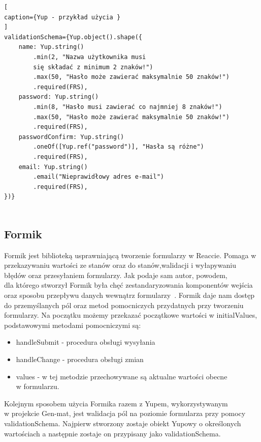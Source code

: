 \documentclass[oneside,polski,logo,indent]{amuthesis}
\begin{document}
\begin{lstlisting}[
caption={Yup - przykład użycia }
]
validationSchema={Yup.object().shape({
	name: Yup.string()
		.min(2, "Nazwa użytkownika musi 
		się składać z minimum 2 znaków!")
		.max(50, "Hasło może zawierać maksymalnie 50 znaków!")
		.required(FRS),
	password: Yup.string()
		.min(8, "Hasło musi zawierać co najmniej 8 znaków!")
		.max(50, "Hasło może zawierać maksymalnie 50 znaków!")
		.required(FRS),
	passwordConfirm: Yup.string()
		.oneOf([Yup.ref("password")], "Hasła są różne")
		.required(FRS),
	email: Yup.string()
		.email("Nieprawidłowy adres e-mail")
		.required(FRS),
})}


\end{lstlisting}


\subsection{Formik}
Formik jest biblioteką usprawniającą tworzenie formularzy w Reaccie. Pomaga w przekazywaniu wartości ze stanów oraz do stanów,walidacji i wyłapywaniu błędów oraz przesyłaniem formularzy.
Jak podaje sam autor, powodem, \\dla którego stworzył Formik była chęć zestandaryzowania komponentów wejścia oraz sposobu przepływu danych wewnątrz formularzy~\cite{formik}.
\newline
Formik daje nam dostęp do przemyślanych pól oraz metod pomocniczych przydatnych przy tworzeniu formularzy. Na początku możemy przekazać
początkowe wartości w initialValues, podstawowymi metodami pomocniczymi są:
\begin{itemize}
\item handleSubmit - procedura obsługi wysyłania
\item handleChange - procedura obsługi zmian
\item values - w tej metodzie przechowywane są aktualne wartości obecne  \\ w formularzu.
\end{itemize}
Kolejnym sposobem użycia Formika razem z Yupem, wykorzystywanym \\w projekcie Gen-mat, jest walidacja pól na poziomie formularza przy pomocy validationSchema. 
Najpierw stworzony zostaje obiekt Yupowy o określonych wartościach a następnie zostaje on przypisany jako validationSchema.
\end{document}
